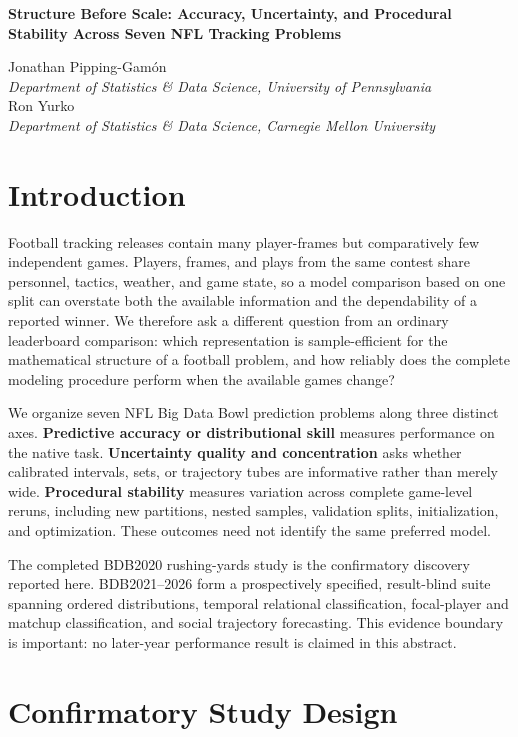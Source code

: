\documentclass[10pt,letterpaper]{article}
\begin{document}
\begin{center}
{\Large\bfseries Structure Before Scale: Accuracy, Uncertainty, and Procedural Stability Across Seven NFL Tracking Problems\par}
\vspace{0.25em}
Jonathan Pipping-Gam\'on\\
\textit{Department of Statistics \& Data Science, University of Pennsylvania}\\
Ron Yurko\\
\textit{Department of Statistics \& Data Science, Carnegie Mellon University}
\end{center}

\section*{Introduction}

Football tracking releases contain many player-frames but comparatively few independent games. Players, frames, and plays from the same contest share personnel, tactics, weather, and game state, so a model comparison based on one split can overstate both the available information and the dependability of a reported winner. We therefore ask a different question from an ordinary leaderboard comparison: which representation is sample-efficient for the mathematical structure of a football problem, and how reliably does the complete modeling procedure perform when the available games change?

We organize seven NFL Big Data Bowl prediction problems along three distinct axes. \textbf{Predictive accuracy or distributional skill} measures performance on the native task. \textbf{Uncertainty quality and concentration} asks whether calibrated intervals, sets, or trajectory tubes are informative rather than merely wide. \textbf{Procedural stability} measures variation across complete game-level reruns, including new partitions, nested samples, validation splits, initialization, and optimization. These outcomes need not identify the same preferred model.

The completed BDB2020 rushing-yards study is the confirmatory discovery reported here. BDB2021--2026 form a prospectively specified, result-blind suite spanning ordered distributions, temporal relational classification, focal-player and matchup classification, and social trajectory forecasting. This evidence boundary is important: no later-year performance result is claimed in this abstract.

\section*{Confirmatory Study Design}
\end{document}
